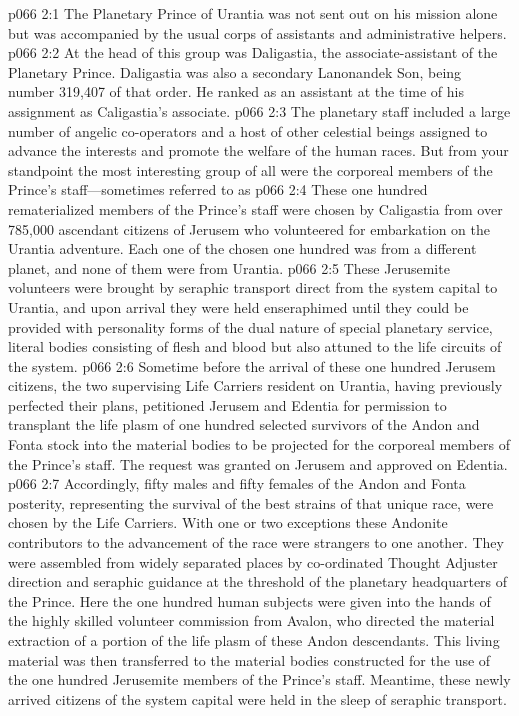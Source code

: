 \vs p066 2:1 The Planetary Prince of Urantia was not sent out on his mission alone but was accompanied by the usual corps of assistants and administrative helpers.
\vs p066 2:2 At the head of this group was Daligastia, the associate\hyp{}assistant of the Planetary Prince. Daligastia was also a secondary Lanonandek Son, being number 319,407 of that order. He ranked as an assistant at the time of his assignment as Caligastia’s associate.
\vs p066 2:3 The planetary staff included a large number of angelic co\hyp{}operators and a host of other celestial beings assigned to advance the interests and promote the welfare of the human races. But from your standpoint the most interesting group of all were the corporeal members of the Prince’s staff---sometimes referred to as 
\pc \vs p066 2:4 These one hundred rematerialized members of the Prince’s staff were chosen by Caligastia from over 785,000 ascendant citizens of Jerusem who volunteered for embarkation on the Urantia adventure. Each one of the chosen one hundred was from a different planet, and none of them were from Urantia.\plusone
\vs p066 2:5 These Jerusemite volunteers were brought by seraphic transport direct from the system capital to Urantia, and upon arrival they were held enseraphimed until they could be provided with personality forms of the dual nature of special planetary service, literal bodies consisting of flesh and blood but also attuned to the life circuits of the system.
\pc \vs p066 2:6 Sometime before the arrival of these one hundred Jerusem citizens, the two supervising Life Carriers resident on Urantia, having previously perfected their plans, petitioned Jerusem and Edentia for permission to transplant the life plasm of one hundred selected survivors of the Andon and Fonta stock into the material bodies to be projected for the corporeal members of the Prince’s staff. The request was granted on Jerusem and approved on Edentia.
\vs p066 2:7 Accordingly, fifty males and fifty females of the Andon and Fonta posterity, representing the survival of the best strains of that unique race, were chosen by the Life Carriers. With one or two exceptions these Andonite contributors to the advancement of the race were strangers to one another. They were assembled from widely separated places by co\hyp{}ordinated Thought Adjuster direction and seraphic guidance at the threshold of the planetary headquarters of the Prince. Here the one hundred human subjects were given into the hands of the highly skilled volunteer commission from Avalon, who directed the material extraction of a portion of the life plasm of these Andon descendants. This living material was then transferred to the material bodies constructed for the use of the one hundred Jerusemite members of the Prince’s staff. Meantime, these newly arrived citizens of the system capital were held in the sleep of seraphic transport.
